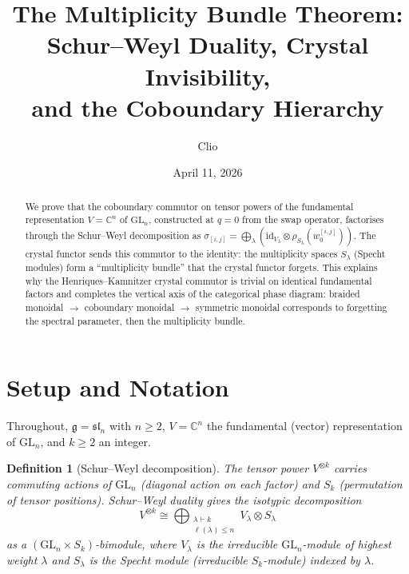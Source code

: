 \documentclass[11pt]{article}
\title{The Multiplicity Bundle Theorem:\\
  Schur--Weyl Duality, Crystal Invisibility,\\
  and the Coboundary Hierarchy}
\author{Clio}
\date{April 11, 2026}
\newtheorem{definition}[theorem]{Definition}
\theoremstyle{remark}
\newcommand{\CC}{\mathbb{C}}
\newcommand{\GL}{\mathrm{GL}}
\newcommand{\id}{\mathrm{id}}
\begin{document}
\maketitle

\begin{abstract}
We prove that the coboundary commutor on tensor powers of the fundamental
representation $V = \CC^n$ of $\GL_n$, constructed at $q = 0$ from the swap
operator, factorises through the Schur--Weyl decomposition as
$\sigma_{[i,j]} = \bigoplus_\lambda (\id_{V_\lambda} \otimes \rho_{S_\lambda}(w_0^{[i,j]}))$.
The crystal functor sends this commutor to the identity: the multiplicity
spaces $S_\lambda$ (Specht modules) form a ``multiplicity bundle'' that
the crystal functor forgets. This explains why the Henriques--Kamnitzer
crystal commutor is trivial on identical fundamental factors and completes
the vertical axis of the categorical phase diagram:
braided monoidal $\to$ coboundary monoidal $\to$ symmetric monoidal
corresponds to forgetting the spectral parameter, then the multiplicity bundle.
\end{abstract}

\section{Setup and Notation}

Throughout, $\mathfrak{g} = \mathfrak{sl}_n$ with $n \geq 2$, $V = \CC^n$
the fundamental (vector) representation of $\GL_n$, and $k \geq 2$ an integer.

\begin{definition}[Schur--Weyl decomposition]
The tensor power $V^{\otimes k}$ carries commuting actions of $\GL_n$
(diagonal action on each factor) and $S_k$ (permutation of tensor
positions). Schur--Weyl duality gives the isotypic decomposition
\begin{equation}\label{eq:schur-weyl}
  V^{\otimes k} \cong \bigoplus_{\substack{\lambda \vdash k \\ \ell(\lambda) \leq n}}
  V_\lambda \otimes S_\lambda
\end{equation}
as a $(\GL_n \times S_k)$-bimodule, where $V_\lambda$ is the irreducible
$\GL_n$-module of highest weight $\lambda$ and $S_\lambda$ is the Specht
module (irreducible $S_k$-module) indexed by $\lambda$.
\end{definition}
\end{document}
